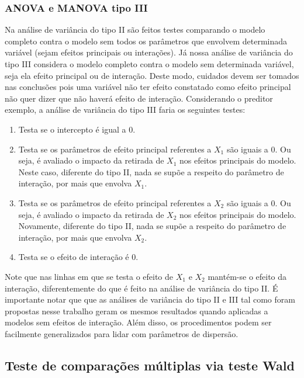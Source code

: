 \documentclass[AMA,STIX1COL]{WileyNJD-v2}
\begin{document}
\subsubsection{ANOVA e MANOVA tipo III}

Na análise de variância do tipo II são feitos testes comparando o modelo completo contra o modelo sem todos os parâmetros que envolvem determinada variável (sejam efeitos principais ou interações). Já nossa análise de variância do tipo III considera o modelo completo contra o modelo sem determinada variável, seja ela efeito principal ou de interação. Deste modo, cuidados devem ser tomados nas conclusões pois uma variável não ter efeito constatado como efeito principal não quer dizer que não haverá efeito de interação. Considerando o preditor exemplo, a análise de variância do tipo III faria os seguintes testes:

\begin{enumerate}
  \item Testa se o intercepto é igual a 0.
  
  \item Testa se os parâmetros de efeito principal referentes a $X_1$ são iguais a 0. Ou seja, é avaliado o impacto da retirada de $X_1$ nos efeitos principais do modelo. Neste caso, diferente do tipo II, nada se supõe a respeito do parâmetro de interação, por mais que envolva $X_1$.
  
  \item Testa se os parâmetros de efeito principal referentes a $X_2$ são iguais a 0. Ou seja, é avaliado o impacto da retirada de $X_2$ nos efeitos principais do modelo. Novamente, diferente do tipo II, nada se supõe a respeito do parâmetro de interação, por mais que envolva $X_2$.
  
  \item Testa se o efeito de interação é 0.
\end{enumerate}

Note que nas linhas em que se testa o efeito de $X_1$ e $X_2$ mantém-se o efeito da interação, diferentemente do que é feito na análise de variância do tipo II. É importante notar que que as análises de variância do tipo II e III tal como foram propostas nesse trabalho geram os mesmos resultados quando aplicadas a modelos sem efeitos de interação. Além disso, os procedimentos podem ser facilmente generalizados para lidar com parâmetros de dispersão.

\subsection{Teste de comparações múltiplas via teste Wald}
\end{document}
